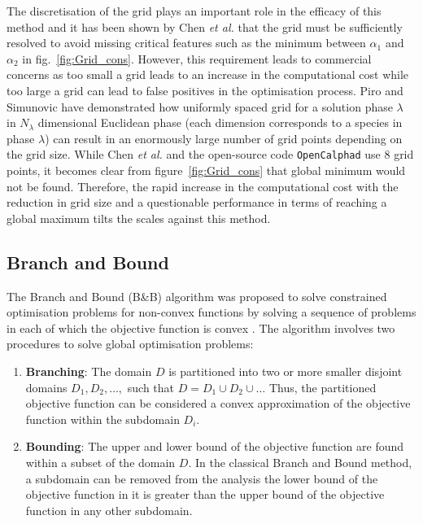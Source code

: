 The discretisation of the grid plays an important role in the efficacy of this method and it has been shown by Chen \textit{et al.} \cite{Chen93b} that the grid must be sufficiently resolved to avoid missing critical features such as the minimum between $\alpha_1$ and $\alpha_2$ in  fig.~\ref{fig:Grid_cons}.  However, this requirement leads to commercial concerns as too small a grid leads to an increase in the computational cost while too large a grid can lead to false positives in the optimisation process.  Piro and Simunovic \cite{Piro16} have demonstrated how uniformly spaced grid for a solution phase $\lambda$ in $N_\lambda$ dimensional Euclidean phase (each dimension corresponds to a species in phase $\lambda$) can result in an enormously large number of grid points depending on the grid size. While Chen \textit{et al.} \cite{Chen93a} and the open-source code \texttt{OpenCalphad} \cite{Sundman:2015aa} use 8 grid points, it becomes clear from figure~\ref{fig:Grid_cons} that global minimum would not be found. Therefore, the rapid increase in the computational cost with the reduction in grid size and a questionable performance in terms of reaching a global maximum tilts the scales against this method.

	\subsection{Branch and Bound}
	The Branch and Bound (B\&B) algorithm was proposed to solve constrained optimisation problems for non-convex functions by solving a sequence of problems in each of which the objective function is convex \cite{Falk69}. The algorithm involves two procedures to solve global optimisation problems:
	\begin{enumerate}
		\item \textbf{Branching}: The domain $D$ is partitioned into two or more smaller disjoint domains $D_1,D_2,\dots,$ such that $D = D_1 \cup D_2 \cup \dots$ Thus, the partitioned objective function can be considered a convex approximation of the objective function within the subdomain $D_i$.
		\item \textbf{Bounding}: The upper and lower bound of the objective function are found within a subset of the domain $D$. In the classical Branch and Bound method, a subdomain can be removed from the analysis the lower bound of the objective function in it is greater than the upper bound of the objective function in any other subdomain.
	\end{enumerate}

